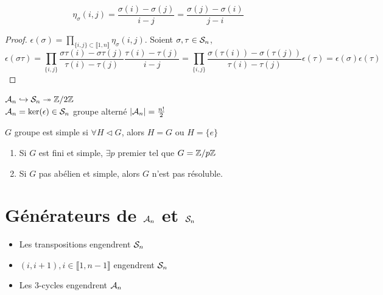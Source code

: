 \documentclass[]{report}
\begin{document}
    \begin{re}{}{}
        \[\eta_\sigma(i,j)=\frac{\sigma(i)-\sigma(j)}{i-j}=\frac{\sigma(j)-\sigma(i)}{j-i}\]
    \end{re}

    \begin{proof}
        $\epsilon(\sigma)=\prod_{\{i,j\}\subset\llbracket 1,n\rrbracket}\eta_{\sigma}(i,j)$. Soient $\sigma,\tau\in\mathcal{S}_n$,
        \[\epsilon(\sigma\tau)=\prod_{\{i,j\}}\frac{\sigma\tau(i)-\sigma\tau(j)}{\tau(i)-\tau(j)}\frac{\tau(i)-\tau(j)}{i-j}=\prod_{\{i,j\}}\frac{\sigma(\tau(i))-\sigma(\tau(j))}{\tau(i)-\tau(j)}\epsilon(\tau)=\epsilon(\sigma)\epsilon(\tau)\]
    \end{proof}

    \begin{df}{}{}
        $\mathcal{A}_n\hookrightarrow \mathcal{S}_n\twoheadrightarrow \mathbb{Z}/2\mathbb{Z}$\\
        $\mathcal{A}_n=\ker(\epsilon)\in\mathcal{S}_n$ groupe alterné $|\mathcal{A}_n|=\frac{n!}{2}$    
    \end{df}

    \begin{df}{}{}
        $G$ groupe est simple si $\forall H\triangleleft G$, alors $H=G$ ou $H=\{e\}$
    \end{df}

    \begin{re}{}{}
        \begin{enumerate}
            \item Si $G$ est fini et simple, $\exists p$ premier tel que $G=\mathbb{Z}/p\mathbb{Z}$
            \item Si $G$ pas abélien et simple, alors $G$ n'est pas résoluble.
        \end{enumerate}
    \end{re}

    \section{Générateurs de $\mathcal{A}_n$ et $\mathcal{S}_n$}

    \begin{itemize}
        \item Les transpositions engendrent $\mathcal{S}_n$
        \item $(i,i+1),i\in\llbracket 1,n-1\rrbracket$ engendrent $\mathcal{S}_n$
        \item Les $3$-cycles engendrent $\mathcal{A}_n$
    \end{itemize}
\end{document}
